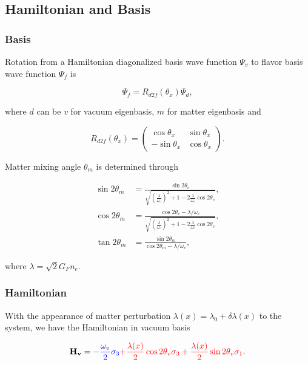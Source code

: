 \documentclass{sciposter}
\begin{document}
\begin{multicols}{3}
\subsection{Hamiltonian and Basis}


\subsubsection{Basis}

Rotation from a Hamiltonian diagonalized basis wave function $\Psi_v$ to flavor basis wave function $\Psi_f$ is

\begin{equation}
\Psi_f = R_{d2f}(\theta_x) \Psi_d,
\end{equation}

where $d$ can be $v$ for vacuum eigenbasis, $m$ for matter eigenbasis and

\begin{equation}
R_{d2f}(\theta_x) = \begin{pmatrix} \cos\theta_x & \sin \theta_x \\ -\sin \theta_x & \cos \theta_x \end{pmatrix}.
\end{equation}

Matter mixing angle $\theta_m$ is determined through

\begin{align}
\sin 2\theta_m &= \frac{\sin 2\theta_v}{ \sqrt{ \left(\frac{\lambda}{\omega_v}\right)^2 + 1 - 2 \frac{\lambda}{\omega_v}\cos 2\theta_v } } , \\
\cos 2\theta_m &= \frac{ \cos 2\theta_v - \lambda/\omega_v  }{ \sqrt{\left( \frac{\lambda}{\omega_v} \right) ^2  +1 - 2 \frac{\lambda}{\omega_v} \cos 2\theta_v } }, \\
\tan 2\theta_m &= \frac{\sin 2\theta_m}{\cos 2\theta_m - \lambda/\omega_v} ,
\end{align}

where $\lambda = \sqrt{2}G_F n_e$.


\subsubsection{Hamiltonian}

With the appearance of matter perturbation $\lambda (x) = \lambda_0 + \delta \lambda(x)$ to the system, we have the Hamiltonian in vacuum basis

\begin{equation}
    \mathbf{H_v} =  {\color{blue} -\frac{\omega_v}{2} \sigma_3 }  { \color{red} + \frac{\lambda (x)}{ 2 } \cos 2\theta_v \sigma_3 + \frac{\lambda(x)}{2} \sin 2\theta_v \sigma_1 } .
\end{equation}


\end{multicols}
\end{document}
